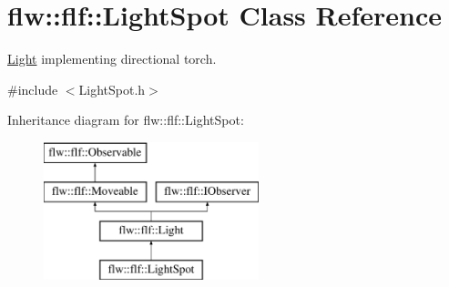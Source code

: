 \hypertarget{classflw_1_1flf_1_1LightSpot}{}\section{flw\+:\+:flf\+:\+:Light\+Spot Class Reference}
\label{classflw_1_1flf_1_1LightSpot}


\hyperlink{classflw_1_1flf_1_1Light}{Light} implementing directional torch.  




{\ttfamily \#include $<$Light\+Spot.\+h$>$}

Inheritance diagram for flw\+:\+:flf\+:\+:Light\+Spot\+:\begin{figure}[H]
\begin{center}
\leavevmode
\includegraphics[height=4.000000cm]{classflw_1_1flf_1_1LightSpot}
\end{center}
\end{figure}
